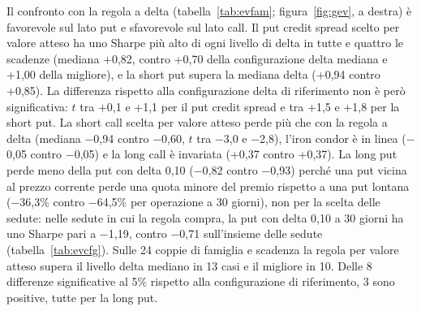 \documentclass[11pt,a4paper]{article}
\begin{document}
Il confronto con la regola a delta (tabella~\ref{tab:evfam}; figura~\ref{fig:gev}, a destra) è favorevole sul lato put e sfavorevole sul lato call. Il put credit spread scelto per valore atteso ha uno Sharpe più alto di ogni livello di delta in tutte e quattro le scadenze (mediana +0{,}82, contro +0{,}70 della configurazione delta mediana e +1{,}00 della migliore), e la short put supera la mediana delta (+0{,}94 contro +0{,}85). La differenza rispetto alla configurazione delta di riferimento non è però significativa: $t$ tra +0{,}1 e +1{,}1 per il put credit spread e tra +1{,}5 e +1{,}8 per la short put. La short call scelta per valore atteso perde più che con la regola a delta (mediana $-$0{,}94 contro $-$0{,}60, $t$ tra $-$3{,}0 e $-$2{,}8), l'iron condor è in linea ($-$0{,}05 contro $-$0{,}05) e la long call è invariata (+0{,}37 contro +0{,}37). La long put perde meno della put con delta 0{,}10 ($-$0{,}82 contro $-$0{,}93) perché una put vicina al prezzo corrente perde una quota minore del premio rispetto a una put lontana ($-$36{,}3\% contro $-$64{,}5\% per operazione a 30 giorni), non per la scelta delle sedute: nelle sedute in cui la regola compra, la put con delta 0{,}10 a 30 giorni ha uno Sharpe pari a $-$1{,}19, contro $-$0{,}71 sull'insieme delle sedute (tabella~\ref{tab:evcfg}). Sulle 24 coppie di famiglia e scadenza la regola per valore atteso supera il livello delta mediano in 13 casi e il migliore in 10. Delle 8 differenze significative al 5\% rispetto alla configurazione di riferimento, 3 sono positive, tutte per la long put.
\end{document}
